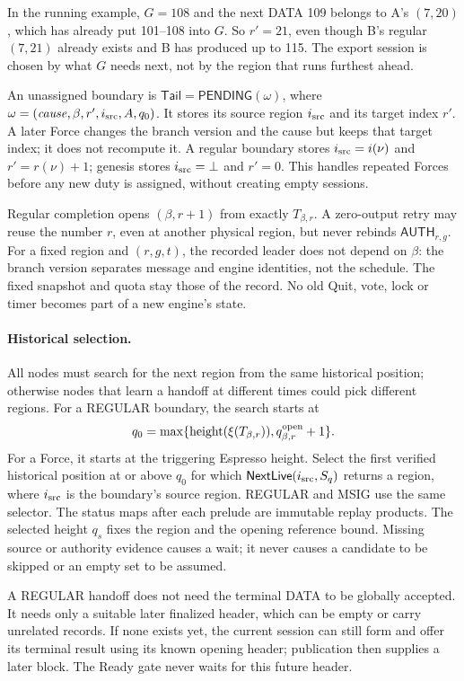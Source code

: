 \documentclass[11pt,a4paper]{article}
\newcommand{\tagg}[1]{\ensuremath{\mathsf{#1}}}
\begin{document}
In the running example, $G=108$ and the next DATA 109 belongs to A's
$(7,20)$, which has already put 101--108 into $G$. So $r'=21$, even though
B's regular $(7,21)$ already exists and B has produced up to 115. The
export session is chosen by what $G$ needs next, not by the region that
runs furthest ahead.

An unassigned boundary is
$\mathsf{Tail}=\tagg{PENDING}(\omega)$, where
$\omega=(\mathit{cause},\beta,r',i_{\rm src},A,q_0)$. It stores its source region $i_{\rm src}$ and its
target index $r'$. A later Force changes the branch version and the
cause but keeps that target index; it does not recompute it. A regular
boundary stores $i_{\rm src}=i(\nu)$ and $r'=r(\nu)+1$; genesis stores
$i_{\rm src}=\bot$ and $r'=0$. This handles repeated Forces
before any new duty is assigned, without creating empty sessions.

Regular completion opens $(\beta,r+1)$ from exactly $T_{\beta,r}$. A
zero-output retry may reuse the number $r$, even at another physical
region, but never rebinds $\tagg{AUTH}_{r,g}$. For a fixed region and
$(r,g,t)$, the recorded leader does not depend on $\beta$: the branch
version separates message and engine identities, not the schedule. The
fixed snapshot and quota stay those of the record. No old Quit, vote,
lock or timer becomes part of a new engine's state.


\paragraph{Historical selection.}
All nodes must search for the next region from the same historical
position; otherwise nodes that learn a handoff at different times could
pick different regions. For a REGULAR boundary, the search starts at
\[
 q_0=\max\{\operatorname{height}(\xi(T_{\beta,r})),
                         q^{\rm open}_{\beta,r}+1\}.
\]
For a Force, it starts at the triggering Espresso height. Select the
first verified historical position at or above $q_0$ for which
$\tagg{NextLive}(i_{\rm src},S_q)$ returns a region, where $i_{\rm src}$
is the boundary's source region. REGULAR and MSIG use the same selector.
The status maps after each prelude are immutable replay products. The selected height $q_s$ fixes the region and
the opening reference bound. Missing source or authority evidence causes
a wait; it never causes a candidate to be skipped or an empty set to be
assumed.

A REGULAR handoff does not need the terminal DATA to be globally
accepted. It needs only a suitable later finalized header, which can be
empty or carry unrelated records. If none exists yet, the current session
can still form and offer its terminal result using its known opening
header; publication then supplies a later block. The Ready gate never
waits for this future header.
\end{document}
